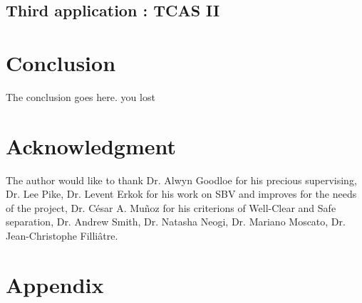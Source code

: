 \documentclass[a4paper,11pt,final]{article}
\begin{document}
  \subsection{Third application : TCAS II}
  
  \section*{Conclusion}
  The conclusion goes here.
  you lost 
  

  \cleardoublepage{}
  
  
  
  
  \section*{Acknowledgment}
  
  The author would like to thank Dr. Alwyn Goodloe for his precious supervising, Dr. Lee Pike, Dr. Levent Erkok for his work on SBV and improves for the needs of the project, Dr. César A. Muñoz for his criterions of Well-Clear and Safe separation, Dr. Andrew Smith, Dr. Natasha Neogi, Dr. Mariano Moscato, Dr. Jean-Christophe Filliâtre.
  
  
  \section*{Appendix}
  
\end{document}
